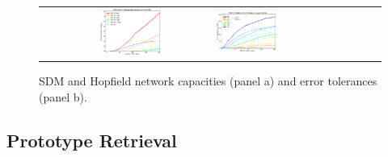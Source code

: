 \documentclass[10pt,letterpaper]{article}
\begin{document}
\begin{center}
\begin{figure}[ht!]
{
	\hfill{}
	\begin{tabular}{lclc}
	\raisebox{3.75in}{(a)} &
		\includegraphics[width=0.4\textwidth]{./figures/capacity-edit.png}
	\raisebox{3.2in}{(b)} &
		\includegraphics[width=0.4\textwidth]{./figures/tolerance-edit.png} 
	\end{tabular}
}
\hfill{}
\caption{SDM and Hopfield network capacities (panel a) and error tolerances (panel b).}
\label{capacityAndErrorTolerance}
\end{figure}
\end{center}


\subsection{Prototype Retrieval}

\end{document}
